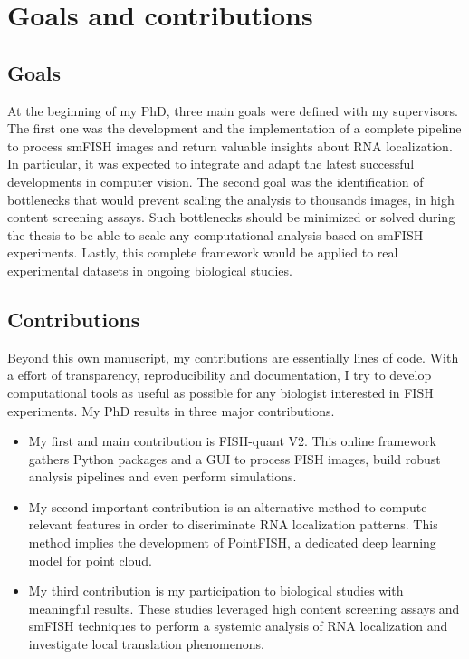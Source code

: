 \section{Goals and contributions}
\label{sec:contributions}

\subsection{Goals}
\label{subsec:intro_goals}

At the beginning of my PhD, three main goals were defined with my supervisors.
The first one was the development and the implementation of a complete pipeline to process \ac{smFISH} images and return valuable insights about \ac{RNA} localization.
In particular, it was expected to integrate and adapt the latest successful developments in computer vision.
The second goal was the identification of bottlenecks that would prevent scaling the analysis to thousands images, in high content screening assays.
Such bottlenecks should be minimized or solved during the thesis to be able to scale any computational analysis based on \ac{smFISH} experiments.
Lastly, this complete framework would be applied to real experimental datasets in ongoing biological studies.

\subsection{Contributions}
\label{subsec:intro_contributions}

Beyond this own manuscript, my contributions are essentially lines of code.
With a effort of transparency, reproducibility and documentation, I try to develop computational tools as useful as possible for any biologist interested in \ac{FISH} experiments.
My PhD results in three major contributions.

\begin{itemize}
	\setlength\itemsep{0.1em}
	\item My first and main contribution is FISH-quant V2.
	This online framework gathers Python packages and a \ac{GUI} to process \ac{FISH} images, build robust analysis pipelines and even perform simulations.
	\item My second important contribution is an alternative method to compute relevant features in order to discriminate \ac{RNA} localization patterns.
	This method implies the development of PointFISH, a dedicated deep learning model for point cloud.
	\item My third contribution is my participation to biological studies with meaningful results.
	These studies leveraged high content screening assays and \ac{smFISH} techniques to perform a systemic analysis of \ac{RNA} localization and investigate local translation phenomenons.
\end{itemize}

